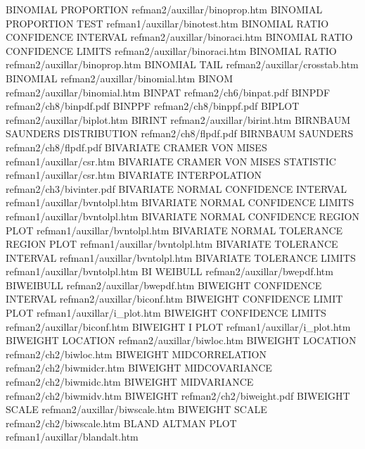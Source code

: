 BINOMIAL PROPORTION                     refman2/auxillar/binoprop.htm
BINOMIAL PROPORTION TEST                refman1/auxillar/binotest.htm
BINOMIAL RATIO CONFIDENCE INTERVAL      refman2/auxillar/binoraci.htm
BINOMIAL RATIO CONFIDENCE LIMITS        refman2/auxillar/binoraci.htm
BINOMIAL RATIO                          refman2/auxillar/binoprop.htm
BINOMIAL TAIL                           refman2/auxillar/crosstab.htm
BINOMIAL                                refman2/auxillar/binomial.htm
BINOM                                   refman2/auxillar/binomial.htm
BINPAT                                  refman2/ch6/binpat.pdf
BINPDF                                  refman2/ch8/binpdf.pdf
BINPPF                                  refman2/ch8/binppf.pdf
BIPLOT                                  refman2/auxillar/biplot.htm
BIRINT                                  refman2/auxillar/birint.htm
BIRNBAUM SAUNDERS DISTRIBUTION          refman2/ch8/flpdf.pdf
BIRNBAUM SAUNDERS                       refman2/ch8/flpdf.pdf
BIVARIATE CRAMER VON MISES              refman1/auxillar/csr.htm
BIVARIATE CRAMER VON MISES STATISTIC    refman1/auxillar/csr.htm
BIVARIATE INTERPOLATION                 refman2/ch3/bivinter.pdf
BIVARIATE NORMAL CONFIDENCE INTERVAL    refman1/auxillar/bvntolpl.htm
BIVARIATE NORMAL CONFIDENCE LIMITS      refman1/auxillar/bvntolpl.htm
BIVARIATE NORMAL CONFIDENCE REGION PLOT refman1/auxillar/bvntolpl.htm
BIVARIATE NORMAL TOLERANCE REGION PLOT  refman1/auxillar/bvntolpl.htm
BIVARIATE TOLERANCE INTERVAL            refman1/auxillar/bvntolpl.htm
BIVARIATE TOLERANCE LIMITS              refman1/auxillar/bvntolpl.htm
BI WEIBULL                              refman2/auxillar/bwepdf.htm
BIWEIBULL                               refman2/auxillar/bwepdf.htm
BIWEIGHT CONFIDENCE INTERVAL            refman2/auxillar/biconf.htm
BIWEIGHT CONFIDENCE LIMIT PLOT          refman1/auxillar/i_plot.htm
BIWEIGHT CONFIDENCE LIMITS              refman2/auxillar/biconf.htm
BIWEIGHT I PLOT                         refman1/auxillar/i_plot.htm
BIWEIGHT LOCATION                       refman2/auxillar/biwloc.htm
BIWEIGHT LOCATION                       refman2/ch2/biwloc.htm
BIWEIGHT MIDCORRELATION                 refman2/ch2/biwmidcr.htm
BIWEIGHT MIDCOVARIANCE                  refman2/ch2/biwmidc.htm
BIWEIGHT MIDVARIANCE                    refman2/ch2/biwmidv.htm
BIWEIGHT                                refman2/ch2/biweight.pdf
BIWEIGHT SCALE                          refman2/auxillar/biwscale.htm
BIWEIGHT SCALE                          refman2/ch2/biwscale.htm
BLAND ALTMAN PLOT                       refman1/auxillar/blandalt.htm
